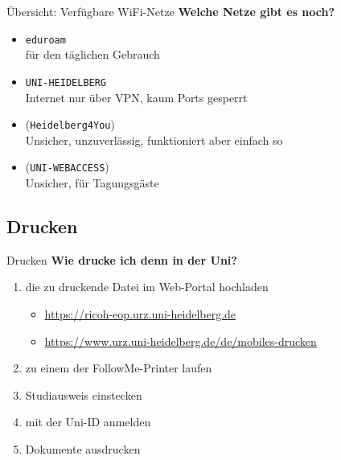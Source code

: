 \begin{frame}{Übersicht: Verfügbare WiFi-Netze}
    \large \textbf{Welche Netze gibt es noch?}
    \normalsize
    \begin{itemize}[<+->]
        \item \texttt{eduroam} \\
            für den täglichen Gebrauch
        \item \texttt{UNI-HEIDELBERG} \\
            Internet nur über VPN, kaum Ports gesperrt
        \item {\color{gray}(\texttt{Heidelberg4You})} \\
            Unsicher, unzuverlässig, funktioniert aber einfach so
        \item {\color{gray}(\texttt{UNI-WEBACCESS})} \\
            Unsicher, für Tagungsgäste
    \end{itemize}
\end{frame}


\subsection{Drucken}
\begin{frame}{Drucken}
    \large \textbf{Wie drucke ich denn in der Uni?}
    \normalsize
    \begin{enumerate}
        \item die zu druckende Datei im Web-Portal hochladen \\
            {\footnotesize
                \begin{itemize}
                    \item \url{https://ricoh-eop.urz.uni-heidelberg.de} \\
                    \item \url{https://www.urz.uni-heidelberg.de/de/mobiles-drucken}
                \end{itemize}
            }
        \item zu einem der FollowMe-Printer laufen
        \item Studiausweis einstecken
        \item mit der Uni-ID anmelden
        \item Dokumente ausdrucken
    \end{enumerate}
\end{frame}

